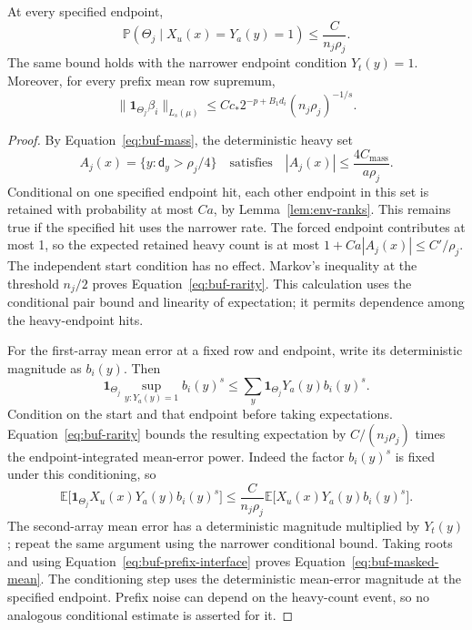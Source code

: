 \begin{lemma}
\label{lem:buf-rarity}
At every specified endpoint,
\begin{equation}
 \mathbb P(\Theta_j\mid X_u(x)=Y_a(y)=1)
      \leq\frac{C}{n_j\rho_j}.
 \label{eq:buf-rarity}
\end{equation}
The same bound holds with the narrower endpoint condition $Y_t(y)=1$.
Moreover, for every prefix mean row supremum,
\begin{equation}
 \|\mathbf1_{\Theta_j}\beta_i\|_{L_s(\mu)}
      \leq Cc_*2^{-p+B_1d_i}(n_j\rho_j)^{-1/s}.
 \label{eq:buf-masked-mean}
\end{equation}
\end{lemma}
\begin{proof}
By Equation~\eqref{eq:buf-mass}, the deterministic heavy set
\[
 A_j(x)=\{y:\mathsf{d}_y>\rho_j/4\}
 \quad\text{satisfies}\quad
 |A_j(x)|\leq\frac{4C_{\mathrm{mass}}}{a\rho_j}.
\]
Conditional on one specified endpoint
hit, each other endpoint in this set is retained with probability at most
$Ca$, by Lemma~\ref{lem:env-ranks}.  This remains true if the
specified hit uses the narrower rate.  The forced endpoint contributes
at most 1, so the expected retained heavy count is at most
$1+Ca|A_j(x)|\leq C'/\rho_j$.
The independent start condition has no effect.  Markov's inequality
at the threshold $n_j/2$ proves Equation~\eqref{eq:buf-rarity}.
This calculation uses the conditional pair bound and linearity of
expectation; it permits dependence among the heavy-endpoint hits.

For the first-array mean error at a fixed row and endpoint, write its
deterministic magnitude as $b_i(y)$.  Then
\[
 \mathbf1_{\Theta_j}\sup_{y:Y_a(y)=1}b_i(y)^s
       \leq\sum_y\mathbf1_{\Theta_j}Y_a(y)b_i(y)^s.
\]
Condition on the start and that endpoint before taking expectations.
Equation~\eqref{eq:buf-rarity} bounds the resulting expectation by
$C/(n_j\rho_j)$ times the endpoint-integrated mean-error power.
Indeed the factor $b_i(y)^s$ is fixed under this conditioning, so
\[
 \mathbb E\bigl[\mathbf1_{\Theta_j}X_u(x)Y_a(y)b_i(y)^s\bigr]
 \leq\frac{C}{n_j\rho_j}
       \mathbb E\bigl[X_u(x)Y_a(y)b_i(y)^s\bigr].
\]
The second-array mean error has a deterministic magnitude multiplied
by $Y_t(y)$; repeat the same argument using the narrower conditional
bound.  Taking roots and using Equation~\eqref{eq:buf-prefix-interface}
proves Equation~\eqref{eq:buf-masked-mean}.  The conditioning step uses
the deterministic mean-error magnitude at the specified endpoint.
Prefix noise can depend on the heavy-count event, so no analogous
conditional estimate is asserted for it.
\end{proof}

